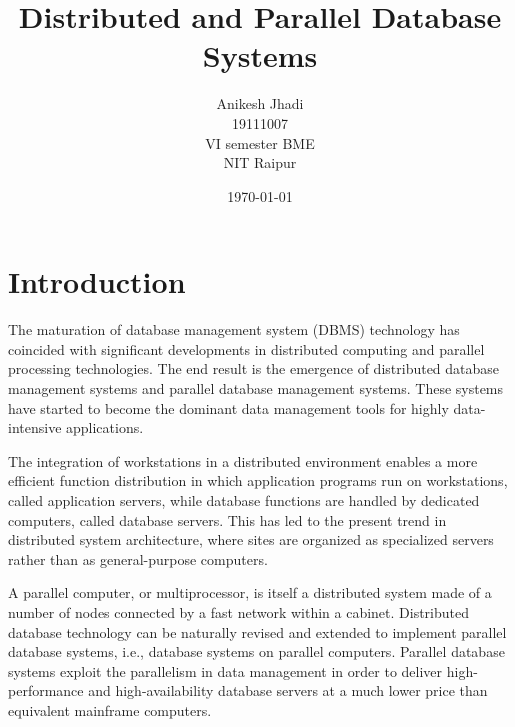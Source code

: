 \documentclass{article}
\title{Distributed and Parallel Database Systems}
\author{Anikesh Jhadi \\19111007 \\VI semester BME \\NIT Raipur}
\date{\today}
\begin{document}
\maketitle

\section{Introduction}
The maturation of database management system (DBMS) technology has coincided with significant developments in distributed computing and parallel processing technologies. The end result is the emergence of distributed database management systems and parallel database management systems. These systems
have started to become the dominant data management tools for highly data-intensive applications.

The integration of workstations in a distributed environment enables a more efficient function distribution in which application programs run on workstations, called application servers, while database functions are handled by dedicated computers, called database servers. This has led to the present trend in distributed system architecture, where sites are organized as specialized servers rather than as general-purpose
computers.

A parallel computer, or multiprocessor, is itself a distributed system made of a number of nodes connected by a fast network within a cabinet. Distributed database technology can
be naturally revised and extended to implement parallel database systems, i.e., database systems on parallel
computers. Parallel database systems exploit the parallelism in
data management in order to deliver high-performance and high-availability database servers at a much lower price than equivalent mainframe computers.
\end{document}
